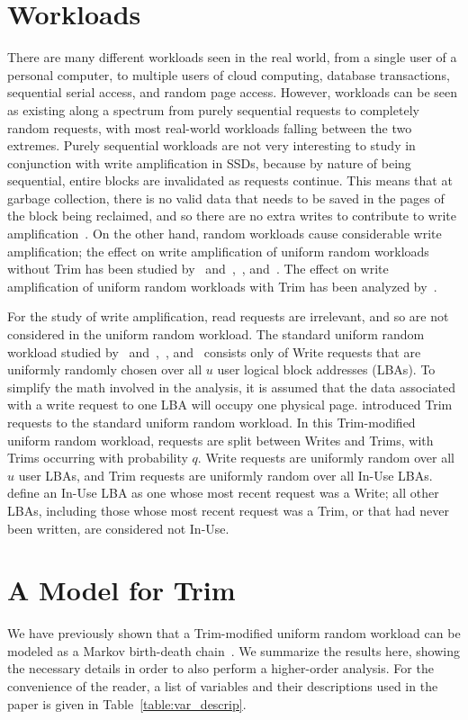 \documentclass[prodmode,acmtos]{acmsmall}
\begin{document}
\section{Workloads}
There are many different workloads seen in the real world, from a single user of a personal computer, to multiple users of cloud computing, database transactions, sequential serial access, and random page access.  However, workloads can be seen as existing along a spectrum from purely sequential requests to completely random requests, with most real-world workloads falling between the two extremes.  Purely sequential workloads are not very interesting to study in conjunction with write amplification in SSDs, because by nature of being sequential, entire blocks are invalidated as requests continue.  This means that at garbage collection, there is no valid data that needs to be saved in the pages of the block being reclaimed, and so there are no extra writes to contribute to write amplification~\cite{Hu2009}.  On the other hand, random workloads cause considerable write amplification; the effect on write amplification of uniform random workloads without Trim has been studied by~ and~,~, and~.  The effect on write amplification of uniform random workloads with Trim has been analyzed by~.

For the study of write amplification, read requests are irrelevant, and so are not considered in the uniform random workload.  The standard uniform random workload studied by~ and~,~, and~ consists only of Write requests that are uniformly randomly chosen over all $u$ user logical block addresses (LBAs).  To simplify the math involved in the analysis, it is assumed that the data associated with a write request to one LBA will occupy one physical page.   introduced Trim requests to the standard uniform random workload.  In this Trim-modified uniform random workload, requests are split between Writes and Trims, with Trims occurring with probability $q$.  Write requests are uniformly random over all $u$ user LBAs, and Trim requests are uniformly random over all In-Use LBAs.   define an In-Use LBA as one whose most recent request was a Write; all other LBAs, including those whose most recent request was a Trim, or that had never been written, are considered not In-Use.


\section{A Model for Trim}\label{sec:trim_model_markov}
We have previously shown that a Trim-modified uniform random workload can be modeled as a Markov birth-death chain~\cite{frankie2012_acmse}.  We summarize the results here, showing the necessary details in order to also perform a higher-order analysis.  For the convenience of the reader, a list of variables and their descriptions used in the paper is given in Table~\ref{table:var_descrip}.
\end{document}
